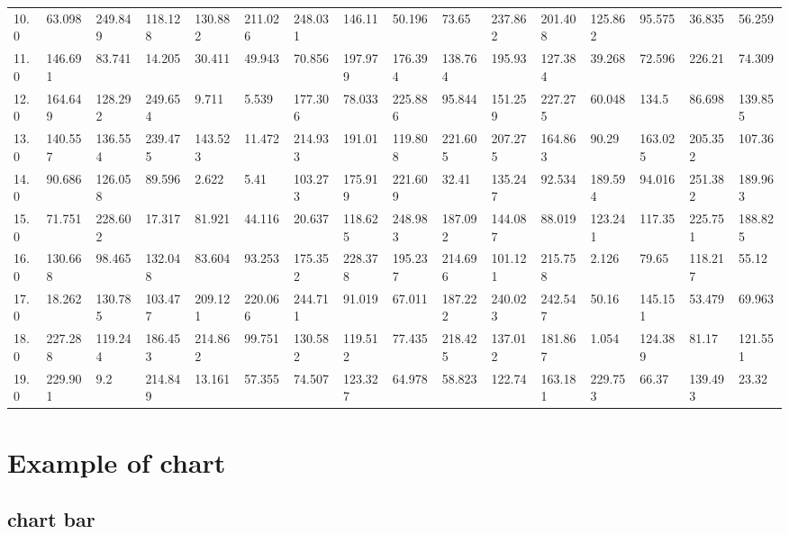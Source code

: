 \documentclass[reprint, floatfix, groupaddress, prb]{article}
\begin{document}
\begin{table}[ht]
{\begin{tabular}[l]{llllllllllllllll}
10.0 & 63.098 & 249.849 & 118.128 & 130.882 & 211.026 & 248.031 & 146.11 & 50.196 & 73.65 & 237.862 & 201.408 & 125.862 & 95.575 & 36.835 & 56.259\\ 
11.0 & 146.691 & 83.741 & 14.205 & 30.411 & 49.943 & 70.856 & 197.979 & 176.394 & 138.764 & 195.93 & 127.384 & 39.268 & 72.596 & 226.21 & 74.309\\ 
12.0 & 164.649 & 128.292 & 249.654 & 9.711 & 5.539 & 177.306 & 78.033 & 225.886 & 95.844 & 151.259 & 227.275 & 60.048 & 134.5 & 86.698 & 139.855\\ 
13.0 & 140.557 & 136.554 & 239.475 & 143.523 & 11.472 & 214.933 & 191.01 & 119.808 & 221.605 & 207.275 & 164.863 & 90.29 & 163.025 & 205.352 & 107.36\\ 
14.0 & 90.686 & 126.058 & 89.596 & 2.622 & 5.41 & 103.273 & 175.919 & 221.609 & 32.41 & 135.247 & 92.534 & 189.594 & 94.016 & 251.382 & 189.963\\ 
15.0 & 71.751 & 228.602 & 17.317 & 81.921 & 44.116 & 20.637 & 118.625 & 248.983 & 187.092 & 144.087 & 88.019 & 123.241 & 117.35 & 225.751 & 188.825\\ 
16.0 & 130.668 & 98.465 & 132.048 & 83.604 & 93.253 & 175.352 & 228.378 & 195.237 & 214.696 & 101.121 & 215.758 & 2.126 & 79.65 & 118.217 & 55.12\\ 
17.0 & 18.262 & 130.785 & 103.477 & 209.121 & 220.066 & 244.711 & 91.019 & 67.011 & 187.222 & 240.023 & 242.547 & 50.16 & 145.151 & 53.479 & 69.963\\ 
18.0 & 227.288 & 119.244 & 186.453 & 214.862 & 99.751 & 130.582 & 119.512 & 77.435 & 218.425 & 137.012 & 181.867 & 1.054 & 124.389 & 81.17 & 121.551\\ 
19.0 & 229.901 & 9.2 & 214.849 & 13.161 & 57.355 & 74.507 & 123.327 & 64.978 & 58.823 & 122.74 & 163.181 & 229.753 & 66.37 & 139.493 & 23.32\\ 
\bottomrule 
 \end{tabular}
}\end{table}

    
    

    \hypertarget{example-of-chart}{%
\section{Example of chart}\label{example-of-chart}}

    \hypertarget{chart-bar}{%
\subsection{chart bar}\label{chart-bar}}
\end{document}
